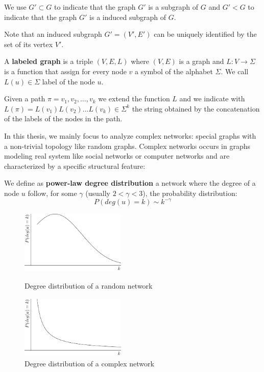 We use $G' \subset G$ to indicate that the graph $G'$ is a subgraph of $G$ and $G' < G$ to indicate that the graph $G'$ is a induced subgraph of $G$.\medskip

Note that an induced subgraph $G' = (V', E')$ can be uniquely identified by the set of its vertex $V'$.

\begin{definizione}\label{def:labeledgraph}
	A \textbf{labeled graph} is a triple $(V,E,L)$ where $(V,E)$ is a graph and $L : V \rightarrow \Sigma$
	is a function that assign for every node $v$ a symbol of the alphabet $\Sigma$. We call $L(u) \in \Sigma$ label of the node $u$.
\end{definizione}

Given a path $\pi = v_{1}, v_{2}, \ldots, v_{k}$ we extend the function $L$ and we indicate with $L(\pi) = L(v_{1}) L(v_{2}) \ldots L(v_{k}) \in \Sigma^{k}$ the string obtained by the concatenation of the labels of the nodes in the path.\medskip

In this thesis, we mainly focus to analyze complex networks: special graphs with a non-trivial topology like random graphs. Complex networks occurs in graphs modeling real system like social networks or computer networks and are characterized by a specific structural feature:

\begin{definizione}\label{def:power-law-graph}
	We define as \textbf{power-law degree distribution} a network where the degree of a node $u$ follow, for some $\gamma$ (usually $2 < \gamma < 3$), the probability distribution:
	\begin{equation}
	P(deg(u) = k) \sim k^{-\gamma}  
	\end{equation}
\end{definizione}

\begin{figure}[h]
	\centering
	\begin{minipage}[t]{.45\textwidth}
		\centering
		\includegraphics[width=5cm,height=3cm]{figure/figure-1-1}
		\caption{Degree distribution of a random network}
	\end{minipage}\hfill
	\begin{minipage}[t]{.45\textwidth}
		\centering 
		\includegraphics[width=5cm,height=3cm]{figure/figure-1-2}
		\caption{Degree distribution of a complex network}
	\end{minipage}
\end{figure}

